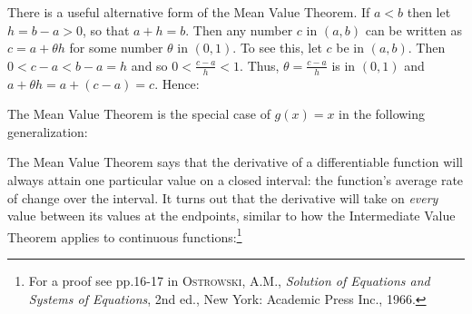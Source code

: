 There is a useful alternative form of the Mean Value Theorem.
If $a < b$ then let $h=b-a>0$, so that $a+h=b$. Then any number $c$ in $(a,b)$
can be written as $c = a + \theta h$ for some number $\theta$ in $(0,1)$. To see
this, let $c$ be in $(a,b)$. Then $0<c-a<b-a=h$ and so $0<\frac{c-a}{h}<1$.
Thus, $\theta = \frac{c-a}{h}$ is in $(0,1)$ and $a + \theta h = a + (c-a)=c$.
Hence:


\noindent The Mean Value Theorem is the special case of $g(x)=x$ in the
following generalization:

\newpage
The Mean Value Theorem says that the derivative of a differentiable function
will always attain one particular value on a closed interval: the function's
average rate of change over the interval. It turns out that the derivative will
take on \emph{every} value between its values at the endpoints, similar to how
the Intermediate Value Theorem applies to continuous functions:\footnote{For a
proof see pp.16-17 in \textsc{Ostrowski, A.M.}, \emph{Solution of Equations and
Systems of Equations}, 2nd ed., New York: Academic Press Inc., 1966.}

